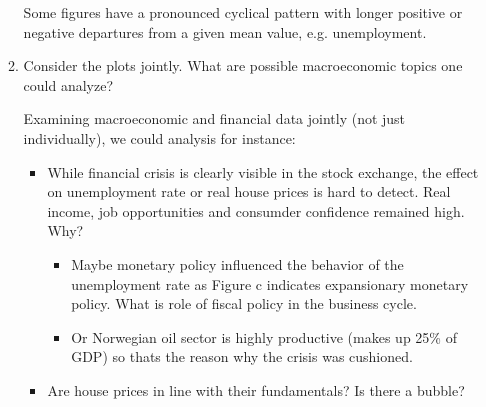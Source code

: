 \begin{enumerate}
\begin{enumerate}
\begin{solution}
                        Some figures have a pronounced cyclical pattern with longer positive or negative departures from a given mean value, e.g. unemployment.
                    \end{solution}

              \item Consider the plots jointly. What are possible macroeconomic topics one could analyze?

                    \begin{solution}
                        Examining macroeconomic and financial data jointly (not just individually), we could analysis for instance:
                        \begin{itemize}
                            \item While financial crisis is clearly visible in the stock exchange, the effect on unemployment rate or real house prices is hard to detect. Real income, job opportunities and consumder confidence remained high. Why?
                                  \begin{itemize}
                                      \item Maybe monetary policy influenced the behavior of the unemployment rate as Figure c indicates expansionary monetary policy. What is role of fiscal policy in the business cycle.

                                      \item Or Norwegian oil sector is highly productive (makes up 25\% of GDP) so thats the reason why the crisis was cushioned.
                                  \end{itemize}

                            \item Are house prices in line with their fundamentals? Is there a bubble?
                        \end{itemize}
                    \end{solution}
          \end{enumerate}
\end{enumerate}
